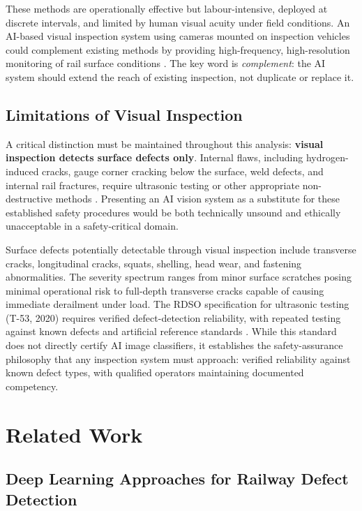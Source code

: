 \documentclass[conference]{IEEE}
\begin{document}
These methods are operationally effective but labour-intensive, deployed at discrete intervals, and limited by human visual acuity under field conditions. An AI-based visual inspection system using cameras mounted on inspection vehicles could complement existing methods by providing high-frequency, high-resolution monitoring of rail surface conditions \cite{pib2017}. The key word is \textit{complement}: the AI system should extend the reach of existing inspection, not duplicate or replace it.

\subsection{Limitations of Visual Inspection}

A critical distinction must be maintained throughout this analysis: \textbf{visual inspection detects surface defects only}. Internal flaws, including hydrogen-induced cracks, gauge corner cracking below the surface, weld defects, and internal rail fractures, require ultrasonic testing or other appropriate non-destructive methods \cite{rdso2020}. Presenting an AI vision system as a substitute for these established safety procedures would be both technically unsound and ethically unacceptable in a safety-critical domain.

Surface defects potentially detectable through visual inspection include transverse cracks, longitudinal cracks, squats, shelling, head wear, and fastening abnormalities. The severity spectrum ranges from minor surface scratches posing minimal operational risk to full-depth transverse cracks capable of causing immediate derailment under load. The RDSO specification for ultrasonic testing (T-53, 2020) requires verified defect-detection reliability, with repeated testing against known defects and artificial reference standards \cite{rdso2020}. While this standard does not directly certify AI image classifiers, it establishes the safety-assurance philosophy that any inspection system must approach: verified reliability against known defect types, with qualified operators maintaining documented competency.

\section{Related Work}
\label{sec:related}

\subsection{Deep Learning Approaches for Railway Defect Detection}
\end{document}
